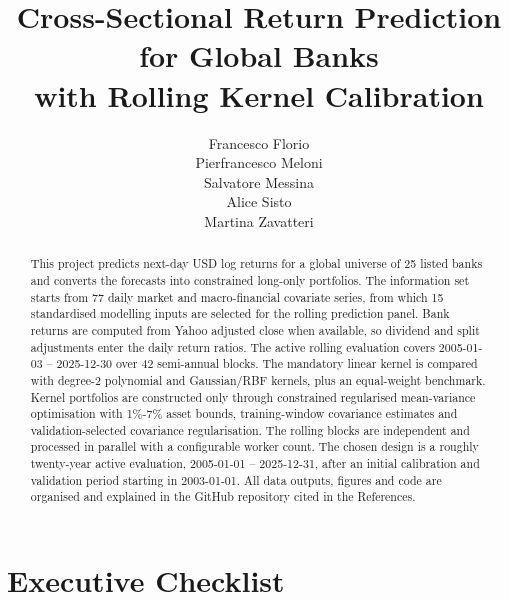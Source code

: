﻿\documentclass[10pt,a4paper]{article}
\title{Cross-Sectional Return Prediction for Global Banks\\with Rolling Kernel Calibration}
\author{Francesco Florio \\ Pierfrancesco Meloni \\ Salvatore Messina \\ Alice Sisto \\ Martina Zavatteri}
\date{}
\begin{document}
\maketitle

\begin{abstract}

This project predicts next-day USD log returns for a global universe of 25 listed banks and converts the forecasts into constrained long-only portfolios. The information set starts from 77 daily market and macro-financial covariate series, from which 15 standardised modelling inputs are selected for the rolling prediction panel. Bank returns are computed from Yahoo adjusted close when available, so dividend and split adjustments enter the daily return ratios. The active rolling evaluation covers 2005-01-03 -- 2025-12-30 over 42 semi-annual blocks. The mandatory linear kernel is compared with degree-2 polynomial and Gaussian/RBF kernels, plus an equal-weight benchmark. Kernel portfolios are constructed only through constrained regularised mean-variance optimisation with 1\%-7\% asset bounds, training-window covariance estimates and validation-selected covariance regularisation. The rolling blocks are independent and processed in parallel with a configurable worker count. The chosen design is a roughly twenty-year active evaluation, 2005-01-01 -- 2025-12-31, after an initial calibration and validation period starting in 2003-01-01. All data outputs, figures and code are organised and explained in the GitHub repository cited in the References.

\end{abstract}

\section{Executive Checklist}
\end{document}
